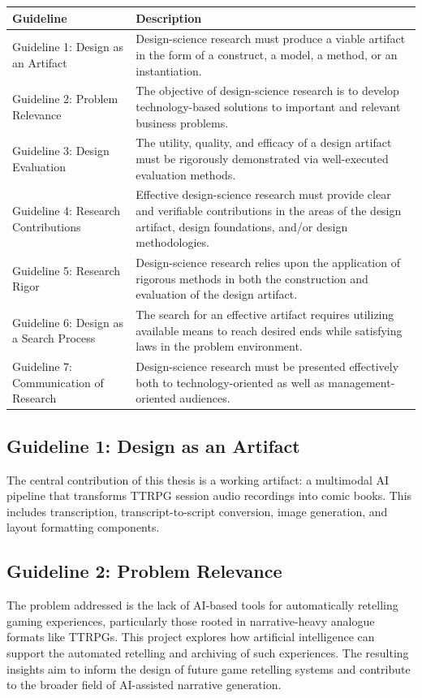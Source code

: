 \begin{table}[htbp]
\centering
\small
\begin{tabular}{|l|p{7.2cm}|}
\hline
\textbf{Guideline} & \textbf{Description} \\
\hline
Guideline 1: Design as an Artifact & Design-science research must produce a viable artifact in the form of a construct, a model, a method, or an instantiation. \\
\hline
Guideline 2: Problem Relevance & The objective of design-science research is to develop technology-based solutions to important and relevant business problems. \\
\hline
Guideline 3: Design Evaluation & The utility, quality, and efficacy of a design artifact must be rigorously demonstrated via well-executed evaluation methods. \\
\hline
Guideline 4: Research Contributions & Effective design-science research must provide clear and verifiable contributions in the areas of the design artifact, design foundations, and/or design methodologies. \\
\hline
Guideline 5: Research Rigor & Design-science research relies upon the application of rigorous methods in both the construction and evaluation of the design artifact. \\
\hline
Guideline 6: Design as a Search Process & The search for an effective artifact requires utilizing available means to reach desired ends while satisfying laws in the problem environment. \\
\hline
Guideline 7: Communication of Research & Design-science research must be presented effectively both to technology-oriented as well as management-oriented audiences. \\
\hline
\end{tabular}
 \label{tab:DSRGuidelines}
\end{table}

\subsection*{Guideline 1: Design as an Artifact}
The central contribution of this thesis is a working artifact: a multimodal AI pipeline that transforms TTRPG session audio recordings into comic books. This includes transcription, transcript-to-script conversion, image generation, and layout formatting components.

\subsection*{Guideline 2: Problem Relevance}
The problem addressed is the lack of AI-based tools for automatically retelling gaming experiences, particularly those rooted in narrative-heavy analogue formats like TTRPGs. This project explores how artificial intelligence can support the automated retelling and archiving of such experiences. The resulting insights aim to inform the design of future game retelling systems and contribute to the broader field of AI-assisted narrative generation.

